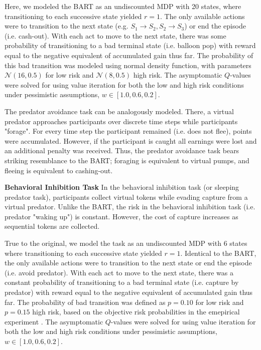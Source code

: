 \documentclass[11pt]{article} %
\begin{document}
Here, we modeled the BART as an undiscounted MDP with 20 states, where transitioning to each successive state yielded $r=1$. The only available actions were to transition to the next state (e.g. $S_1 \rightarrow S_2, S_2 \rightarrow S_3$) or end the episode (i.e. cash-out). With each act to move to the next state, there was some probability of transitioning to a bad terminal state (i.e. balloon pop) with reward equal to the negative equivalent of accumulated gain thus far. The probability of this bad transition was modeled using normal density function, with parameters $\mathcal{N}(16,0.5)$ for low risk and $\mathcal{N}(8,0.5)$ high risk. The asymptomatic $Q$-values were solved for using value iteration for both the low and high risk conditions under pessimistic assumptions, $w \in [1.0, 0.6, 0.2]$.

The predator avoidance task \citep{fung2019} can be analogously modeled. There, a virtual predator approaches participants over discrete time steps while participants "forage". For every time step the participant remained (i.e. does not flee), points were accumulated. However, if the participant is caught all earnings were lost and an additional penalty was received. Thus, the predator avoidance task bears striking resemblance to the BART; foraging is equivalent to virtual pumps, and fleeing is equivalent to cashing-out.  

\textbf{Behavioral Inhibition Task} In the behavioral inhibition task \citep{bach2015} (or sleeping predator task), participants collect virtual tokens while evading capture from a virtual predator. Unlike the BART, the risk in the behavioral inhibition task (i.e. predator "waking up") is constant. However, the cost of capture increases as sequential tokens are collected.

True to the original, we model the task as an undiscounted MDP with 6 states where transitioning to each successive state yielded $r=1$. Identical to the BART, the only available actions were to transition to the next state or end the episode (i.e. avoid predator). With each act to move to the next state, there was a constant probability of transitioning to a bad terminal state (i.e. capture by predator) with reward equal to the negative equivalent of accumulated gain thus far. The probability of bad transition was defined as $p = 0.10$ for low risk and $p = 0.15$ high risk, based on the objective risk probabilities in the emepirical experiment \citep{bach2015}. The asymptomatic $Q$-values were solved for using value iteration for both the low and high risk conditions under pessimistic assumptions, $w \in [1.0, 0.6, 0.2]$.
\end{document}

